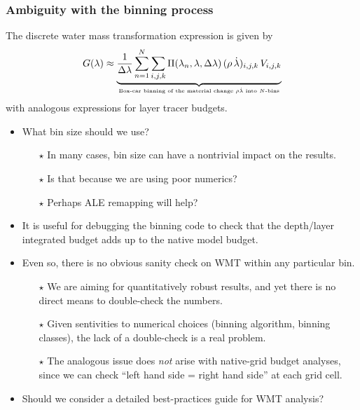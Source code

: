 \documentclass[10pt]{beamer}
\begin{document}
\begin{frame}
  \frametitle{Ambiguity with the binning process}

  The discrete water mass transformation expression is given by
\begin{equation}
G(\lambda) 
\approx 
\underbrace{
  \frac{1}{\Delta \lambda} \sum_{n=1}^{N} \sum_{i,j,k}
  \Pi(\lambda_{n},\lambda,\Delta \lambda)
  \, (\rho \, \dot{\lambda})_{i,j,k} \, V_{i,j,k}
}_{\mbox{\tiny Box-car binning of the material change $\rho \dot{\lambda}$  into $N$-bins}}
\label{eq:wmt-discrete-math}
\end{equation}
 with analogous expressions for layer tracer budgets.  

\begin{exampleblock}{}
\begin{itemize}
\item What bin size should we use?  
   \begin{itemize} \footnotesize 
   \item[$\star$] In many cases, bin size can have a nontrivial impact on the results.
   \item[$\star$] Is that because we are using poor numerics?  
   \item[$\star$] Perhaps ALE remapping will help? 
\end{itemize}

\item It is useful for debugging the binning code to check that the
  depth/layer integrated budget adds up to the native model
  budget. 

\item Even so, there is no obvious sanity check on WMT
     within any particular bin.
     \begin{itemize}\footnotesize
     \item[$\star$] We are aiming for quantitatively robust
       results, and yet there is no direct means to double-check
       the numbers. 
     \item[$\star$] Given sentivities to numerical choices (binning
       algorithm, binning classes), the lack of a double-check is a
       real problem.
     \item[$\star$] The analogous issue does {\it not} arise with
       native-grid budget analyses, since we can check ``left hand
       side = right hand side'' at each grid cell.  
    \end{itemize}

  \item Should we consider a detailed best-practices guide for WMT analysis?

\end{itemize}
\end{exampleblock}{}


\end{frame}
\end{document}
